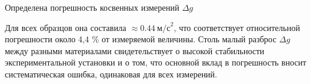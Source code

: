 \documentclass[14pt,a4paper]{extarticle}
\begin{document}
Определена погрешность косвенных измерений \(\Delta g\)

Для всех образцов она составила $\approx 0.44\ \text{м/с}^2$, что соответствует относительной погрешности около 4,4 \% от измеряемой величины. Столь малый разброс  \(\Delta g\) между разными материалами свидетельствует о высокой стабильности экспериментальной установки и о том, что основной вклад в погрешность вносит систематическая ошибка, одинаковая для всех измерений.
\end{document}
